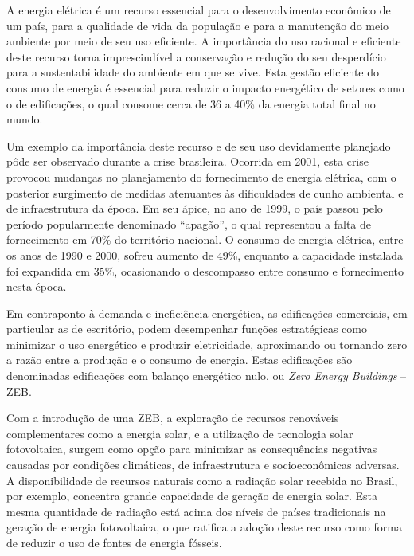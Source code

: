 \begin{onehalfspace}
\footnotesize
    \noindent A energia elétrica é um recurso essencial para o desenvolvimento econômico de um país, para a qualidade de vida da população e para a manutenção do meio ambiente por meio de seu uso eficiente. A importância do uso racional e eficiente deste recurso torna imprescindível a conservação e redução do seu desperdício para a sustentabilidade do ambiente em que se vive. Esta gestão eficiente do consumo de energia é essencial para reduzir o impacto energético de setores como o de edificações, o qual consome cerca de 36 a 40\% da energia total final no mundo.\vspace*{0.3cm}
    
    \noindent Um exemplo da importância deste recurso e de seu uso devidamente planejado pôde ser observado durante a crise brasileira. Ocorrida em 2001, esta crise provocou mudanças no planejamento do fornecimento de energia elétrica, com o posterior surgimento de medidas atenuantes às dificuldades de cunho ambiental e de infraestrutura da época. Em seu ápice, no ano de 1999, o país passou pelo período popularmente denominado “apagão”, o qual representou a falta de fornecimento em 70\% do território nacional. O consumo de energia elétrica, entre os anos de 1990 e 2000, sofreu aumento de 49\%, enquanto a capacidade instalada foi expandida em 35\%, ocasionando o descompasso entre consumo e fornecimento nesta época.\vspace*{0.3cm}

    \noindent Em contraponto à demanda e ineficiência energética, as edificações comerciais, em particular as de escritório, podem desempenhar funções estratégicas como minimizar o uso energético e produzir eletricidade, aproximando ou tornando zero a razão entre a produção e o consumo de energia. Estas edificações são denominadas edificações com balanço energético nulo, ou \textit{Zero Energy Buildings} – ZEB.\vspace*{0.3cm}

    \noindent Com a introdução de uma ZEB, a exploração de recursos renováveis complementares como a energia solar, e a utilização de tecnologia solar fotovoltaica, surgem como opção para minimizar as consequências negativas causadas por condições climáticas, de infraestrutura e socioeconômicas adversas. A disponibilidade de recursos naturais como a radiação solar recebida no Brasil, por exemplo, concentra grande capacidade de geração de energia solar. Esta mesma quantidade de radiação está acima dos níveis de países tradicionais na geração de energia fotovoltaica, o que ratifica a adoção deste recurso como forma de reduzir o uso de fontes de energia fósseis.\vspace*{0.3cm}


\end{onehalfspace}
